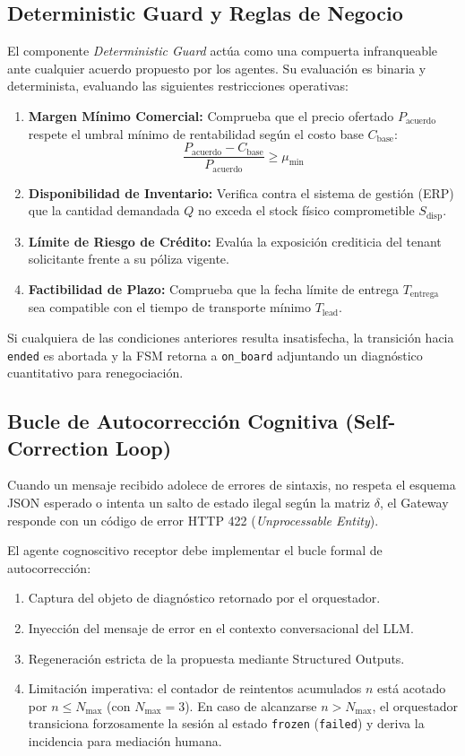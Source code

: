 \subsection{Deterministic Guard y Reglas de Negocio}
El componente \textit{Deterministic Guard} actúa como una compuerta infranqueable ante cualquier acuerdo propuesto por los agentes. Su evaluación es binaria y determinista, evaluando las siguientes restricciones operativas:
\begin{enumerate}
    \item \textbf{Margen Mínimo Comercial:} Comprueba que el precio ofertado $P_{\text{acuerdo}}$ respete el umbral mínimo de rentabilidad según el costo base $C_{\text{base}}$:
    \begin{equation}
        \frac{P_{\text{acuerdo}} - C_{\text{base}}}{P_{\text{acuerdo}}} \ge \mu_{\min}
    \end{equation}
    \item \textbf{Disponibilidad de Inventario:} Verifica contra el sistema de gestión (ERP) que la cantidad demandada $Q$ no exceda el stock físico comprometible $S_{\text{disp}}$.
    \item \textbf{Límite de Riesgo de Crédito:} Evalúa la exposición crediticia del tenant solicitante frente a su póliza vigente.
    \item \textbf{Factibilidad de Plazo:} Comprueba que la fecha límite de entrega $T_{\text{entrega}}$ sea compatible con el tiempo de transporte mínimo $T_{\text{lead}}$.
\end{enumerate}

Si cualquiera de las condiciones anteriores resulta insatisfecha, la transición hacia \texttt{ended} es abortada y la FSM retorna a \texttt{on\_board} adjuntando un diagnóstico cuantitativo para renegociación.

\subsection{Bucle de Autocorrección Cognitiva (Self-Correction Loop)}
Cuando un mensaje recibido adolece de errores de sintaxis, no respeta el esquema JSON esperado o intenta un salto de estado ilegal según la matriz $\delta$, el Gateway responde con un código de error HTTP 422 (\textit{Unprocessable Entity}).

El agente cognoscitivo receptor debe implementar el bucle formal de autocorrección:
\begin{enumerate}
    \item Captura del objeto de diagnóstico retornado por el orquestador.
    \item Inyección del mensaje de error en el contexto conversacional del LLM.
    \item Regeneración estricta de la propuesta mediante Structured Outputs.
    \item Limitación imperativa: el contador de reintentos acumulados $n$ está acotado por $n \le N_{\max}$ (con $N_{\max} = 3$). En caso de alcanzarse $n > N_{\max}$, el orquestador transiciona forzosamente la sesión al estado \texttt{frozen} (\texttt{failed}) y deriva la incidencia para mediación humana.
\end{enumerate}

